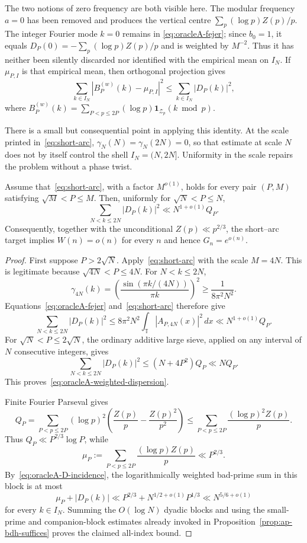 The two notions of zero frequency are both visible here.  The modular
frequency $a=0$ has been removed and produces the vertical centre
$\sum_p(\log p)Z(p)/p$.  The integer Fourier mode $k=0$ remains in
\eqref{eq:oracleA-fejer}; since $b_0=1$, it equals
$D_P(0)=-\sum_p(\log p)Z(p)/p$ and is weighted by $M^{-2}$.
Thus it has neither been silently discarded nor identified with the
empirical mean on $I_N$.  If $\mu_{P,I}$ is that empirical mean, then
orthogonal projection gives
\[
 \sum_{k\in I_N}|B_P^{(w)}(k)-\mu_{P,I}|^2
 \leq\sum_{k\in I_N}|D_P(k)|^2,
\]
where $B_P^{(w)}(k)=\sum_{P<p\leq2P}(\log p)
\mathbf1_{\mathcal Z_p}(k\bmod p)$.

There is a small but consequential point in applying this identity.
At the scale printed in~\eqref{eq:short-arc},
$\gamma_N(N)=\gamma_N(2N)=0$, so that estimate at scale $N$ does not by
itself control the shell $I_N=(N,2N]$.  Uniformity in the scale repairs
the problem without a phase twist.

\begin{proposition}
\label{prop:oracleA-gallagher}
Assume that~\eqref{eq:short-arc}, with a factor $M^{o(1)}$, holds for
every pair $(P,M)$ satisfying $\sqrt M<P\leq M$.  Then, uniformly for
$\sqrt N<P\leq N$,
\begin{equation}
 \sum_{N<k\leq2N}|D_P(k)|^2\ll N^{1+o(1)}Q_P.
 \label{eq:oracleA-weighted-dispersion}
\end{equation}
Consequently, together with the unconditional $Z(p)\ll p^{2/3}$, the
short--arc target implies $W(n)=o(n)$ for every $n$ and hence
$G_n=e^{o(n)}$.
\end{proposition}

\begin{proof}
First suppose $P>2\sqrt N$.  Apply~\eqref{eq:short-arc} with the scale
$M=4N$.  This is legitimate because $\sqrt{4N}<P\leq4N$.  For
$N<k\leq2N$,
\[
 \gamma_{4N}(k)
 =\left(\frac{\sin(\pi k/(4N))}{\pi k}\right)^2
 \geq\frac1{8\pi^2N^2}.
\]
Equations~\eqref{eq:oracleA-fejer} and~\eqref{eq:short-arc} therefore give
\[
 \sum_{N<k\leq2N}|D_P(k)|^2
 \leq8\pi^2N^2\int_{\mathbb T}|A_{P,4N}(x)|^2\,dx
 \ll N^{1+o(1)}Q_P.
\]
For $\sqrt N<P\leq2\sqrt N$, the ordinary additive large sieve, applied
on any interval of $N$ consecutive integers, gives
\[
 \sum_{N<k\leq2N}|D_P(k)|^2
 \leq (N+4P^2)Q_P\ll NQ_P.
\]
This proves~\eqref{eq:oracleA-weighted-dispersion}.

Finite Fourier Parseval gives
\begin{equation}
 Q_P=\sum_{P<p\leq2P}(\log p)^2
 \left(\frac{Z(p)}p-\frac{Z(p)^2}{p^2}\right)
 \leq\sum_{P<p\leq2P}\frac{(\log p)^2Z(p)}p.
 \label{eq:oracleA-Q-parseval}
\end{equation}
Thus $Q_P\ll P^{2/3}\log P$, while
\[
 \mu_P:=\sum_{P<p\leq2P}\frac{(\log p)Z(p)}p\ll P^{2/3}.
\]
By~\eqref{eq:oracleA-D-incidence}, the logarithmically weighted bad-prime
sum in this block is at most
\[
 \mu_P+|D_P(k)|
 \ll P^{2/3}+N^{1/2+o(1)}P^{1/3}
 \ll N^{5/6+o(1)}
\]
for every $k\in I_N$.  Summing the $O(\log N)$ dyadic blocks and using the
small-prime and companion-block estimates already invoked in
Proposition~\ref{prop:ap-bdh-suffices} proves the claimed all-index bound.
\end{proof}


